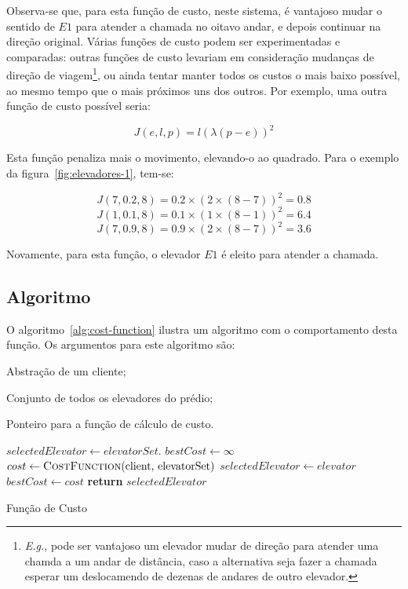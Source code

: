 Observa-se que, para esta função de custo, neste sistema, é vantajoso mudar o
sentido de $E1$ para atender a chamada no oitavo andar, e depois continuar na
direção original. Várias funções de custo podem ser experimentadas e comparadas:
outras funções de custo levariam em consideração mudanças de direção de
viagem\footnote{\textit{E.g.}, pode ser vantajoso um elevador mudar de direção
para atender uma chamda a um andar de distância, caso a alternativa seja fazer a
chamada esperar um deslocamendo de dezenas de andares de outro elevador.}, ou
ainda tentar manter todos os custos o mais baixo possível, ao mesmo tempo que o
mais próximos uns dos outros. Por exemplo, uma outra função de custo possível
seria:

\[J(e, l, p) = l(\lambda(p - e))^{2}\]

Esta função penaliza mais o movimento, elevando-o ao quadrado. Para o exemplo da
figura~\ref{fig:elevadores-1}, tem-se:

\[J(7, 0.2, 8) = 0.2 \times (2 \times (8-7))^2 = 0.8\]
\[J(1, 0.1, 8) = 0.1 \times (1 \times (8-1))^2 = 6.4\]
\[J(7, 0.9, 8) = 0.9 \times (2 \times (8-7))^2 = 3.6\]

Novamente, para esta função, o elevador $E1$ é eleito para atender a chamada.

\subsection{Algoritmo}

O algoritmo~\ref{alg:cost-function} ilustra um algoritmo com o comportamento desta
função. Os argumentos para este algoritmo são:

\newpage

\begin{description}[leftmargin=!,labelwidth=\widthof{\bfseries $costFunction$}]
  \item[$client$] Abstração de um cliente;
  \item[$elevatorset$] Conjunto de todos os elevadores do prédio;
  \item[$costFunction$] Ponteiro para a função de cálculo de custo.
\end{description}

\begin{algorithm}[htb]
\begin{center}
\begin{algorithmic}[1]
  \State $selectedElevator \leftarrow elevatorSet.$
  \State $bestCost \leftarrow \infty$
    \State $cost \leftarrow \Call{CostFunction}{$client, elevatorSet$}$
      \State $selectedElevator \leftarrow elevator$
      \State $bestCost \leftarrow cost$
    \EndIf
  \EndFor
  \State \textbf{return} $selectedElevator$
\EndFunction
\end{algorithmic}
\end{center}
\caption
   {\label{alg:cost-function}Função de Custo}
\end{algorithm}

